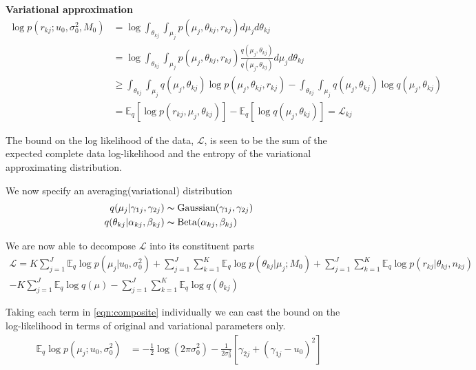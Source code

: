 \documentclass[10pt, letterpaper]{article}
\newcommand{\E}{\mathbb{E}}
\begin{document}
{\bf Variational approximation}
\begin{align}
\log p(r_{kj}; u_0, \sigma_0^2, M_0) & = \log \int_{\theta_{kj}} \int_{\mu_j} p(\mu_j, \theta_{kj}, r_{kj})d\mu_jd\theta_{kj} \\
& = \log \int_{\theta_{kj}} \int_{\mu_j} p(\mu_j, \theta_{kj}, r_{kj}) \frac{q(\mu_j, \theta_{kj})}{q(\mu_j, \theta_{kj})}  d\mu_jd\theta_{kj}\\
& \geq  \int_{\theta_{kj}} \int_{\mu_j} q(\mu_j, \theta_{kj}) \log p(\mu_j, \theta_{kj}, r_{kj}) -  \int_{\theta_{kj}} \int_{\mu_j} q(\mu_j, \theta_{kj}) \log q(\mu_j, \theta_{kj}) \\
& = \E_q \left[ \log p(r_{kj}, \mu_j, \theta_{kj}) \right] - \E_q\left[ \log q(\mu_j, \theta_{kj}) \right] = \mathcal{L}_{kj}
\end{align}

The bound on the log likelihood of the data, $\mathcal{L}$, is seen to be the sum of the expected complete data log-likelihood and the entropy of the variational approximating distribution.

We now specify an averaging(variational) distribution
\begin{align}
q(\mu_j | \gamma_{1j}, \gamma_{2j}) & \thicksim \text{Gaussian}(\gamma_{1j}, \gamma_{2j})\\
q(\theta_{kj} | \alpha_{kj}, \beta_{kj} ) & \thicksim \text{Beta}(\alpha_{kj}, \beta_{kj})
\end{align}

We are now able to decompose $\mathcal{L}$ into its constituent parts
\begin{multline}\label{eqn:composite}
\mathcal{L} = K\sum_{j=1}^J \E_q\log p(\mu_j|u_0,\sigma_0^2) + \sum_{j=1}^J\sum_{k=1}^K\E_q \log p(\theta_{kj} | \mu_j; M_0) 
+ \sum_{j=1}^J\sum_{k=1}^K\E_q \log p(r_{kj} | \theta_{kj}, n_{kj})\\
- K\sum_{j=1}^J\E_q \log q(\mu) - \sum_{j=1}^J\sum_{k=1}^K \E_q \log q(\theta_{kj})
\end{multline}

Taking each term in \eqref{eqn:composite} individually we can cast the bound on the log-likelihood in terms of original and variational parameters only.
\begin{align}
\E_q \log p(\mu_j ; u_0, \sigma_0^2) & = -\frac{1}{2}\log (2\pi\sigma_0^2) -\frac{1}{2\sigma_0^2}\left[ \gamma_{2j} + (\gamma_{1j} - u_0)^2 \right]
\end{align}
\end{document}
